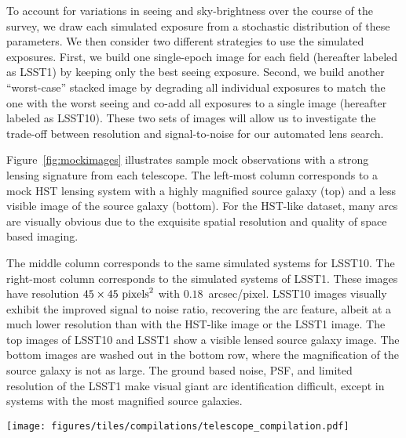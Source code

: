 \documentclass{emulateapj}
\begin{document}
To account for variations in seeing and sky-brightness over the course
of the survey, we draw each simulated exposure from a stochastic
distribution of these parameters. We then consider two different
strategies to use the simulated exposures. First, we build one
single-epoch image for each field (hereafter labeled as LSST1) by
keeping only the best seeing exposure.  Second, we build another
``worst-case'' stacked image by degrading all individual exposures to
match the one with the worst seeing and co-add all exposures to a
single image (hereafter labeled as LSST10).  These two sets of images
will allow us to investigate the trade-off between resolution and
signal-to-noise for our automated lens search.

Figure~\ref{fig:mockimages} illustrates sample mock observations with
a strong lensing signature from each telescope.  The left-most column
corresponds to a mock HST lensing system with a highly magnified
source galaxy (top) and a less visible image of the source galaxy
(bottom). For the HST-like dataset, many arcs are visually obvious due
to the exquisite spatial resolution and quality of space based
imaging.

The middle column corresponds to the same simulated systems for
LSST10.  The right-most column corresponds to the simulated systems of
LSST1.  These images have resolution $45\times45~{\rm pixels}^2$ with
$0.18$~arcsec/pixel.  LSST10 images visually exhibit the improved
signal to noise ratio, recovering the arc feature, albeit at a much
lower resolution than with the HST-like image or the LSST1 image.  The
top images of LSST10 and LSST1 show a visible lensed source galaxy
image.  The bottom images are washed out in the bottom row, where the
magnification of the source galaxy is not as large.  The ground based
noise, PSF, and limited resolution of the LSST1 make visual giant arc
identification difficult, except in systems with the most magnified
source galaxies.

\begin{figure*}[t]
\begin{center}
\texttt{[image: figures/tiles/compilations/telescope\_compilation.pdf]}
\caption{Left to right show example mock HST, LSST 10 year, and LSST 1
  year images.  The top row corresponds to a lensing system with a
  very visible arc signature, and the bottom row to a lensing system
  that is less obvious.  Example mock HST images have
  $n_\text{pix}\times n_\text{pix}=300\times300$.  Example mock LSST
  images have $n_\text{pix}\times n_\text{pix}=45\times45$.  The
  resolution and noise of a ground based telescope is noticeably
  worse. Visual identification of giant arcs in the LSST images in the
  bottom row is very difficult.}\label{fig:mockimages}
\end{center}
\end{figure*}
\end{document}
